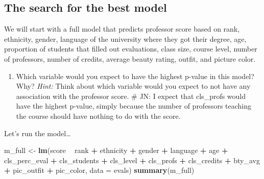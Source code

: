 \documentclass[]{article}
\newenvironment{Shaded}{\begin{snugshade}}{\end{snugshade}}
\newcommand{\KeywordTok}[1]{\textcolor[rgb]{0.13,0.29,0.53}{\textbf{#1}}}
\newcommand{\DataTypeTok}[1]{\textcolor[rgb]{0.13,0.29,0.53}{#1}}
\newcommand{\StringTok}[1]{\textcolor[rgb]{0.31,0.60,0.02}{#1}}
\newcommand{\OperatorTok}[1]{\textcolor[rgb]{0.81,0.36,0.00}{\textbf{#1}}}
\newcommand{\NormalTok}[1]{#1}
\providecommand{\tightlist}{%
  \setlength{\itemsep}{0pt}\setlength{\parskip}{0pt}}
\begin{document}
\subsection{The search for the best
model}\label{the-search-for-the-best-model}

We will start with a full model that predicts professor score based on
rank, ethnicity, gender, language of the university where they got their
degree, age, proportion of students that filled out evaluations, class
size, course level, number of professors, number of credits, average
beauty rating, outfit, and picture color.

\begin{enumerate}
\def\labelenumi{\arabic{enumi}.}
\setcounter{enumi}{10}
\tightlist
\item
  Which variable would you expect to have the highest p-value in this
  model? Why? \emph{Hint:} Think about which variable would you expect
  to not have any association with the professor score. \# JN: I expect
  that cls\_profs would have the highest p-value, simply because the
  number of professors teaching the course should have nothing to do
  with the score.
\end{enumerate}

Let's run the model\ldots{}

\begin{Shaded}
\begin{Highlighting}[]
\NormalTok{m_full <-}\StringTok{ }\KeywordTok{lm}\NormalTok{(score }\OperatorTok{~}\StringTok{ }\NormalTok{rank }\OperatorTok{+}\StringTok{ }\NormalTok{ethnicity }\OperatorTok{+}\StringTok{ }\NormalTok{gender }\OperatorTok{+}\StringTok{ }\NormalTok{language }\OperatorTok{+}\StringTok{ }\NormalTok{age }\OperatorTok{+}\StringTok{ }\NormalTok{cls_perc_eval }
             \OperatorTok{+}\StringTok{ }\NormalTok{cls_students }\OperatorTok{+}\StringTok{ }\NormalTok{cls_level }\OperatorTok{+}\StringTok{ }\NormalTok{cls_profs }\OperatorTok{+}\StringTok{ }\NormalTok{cls_credits }\OperatorTok{+}\StringTok{ }\NormalTok{bty_avg }
             \OperatorTok{+}\StringTok{ }\NormalTok{pic_outfit }\OperatorTok{+}\StringTok{ }\NormalTok{pic_color, }\DataTypeTok{data =}\NormalTok{ evals)}
\KeywordTok{summary}\NormalTok{(m_full)}
\end{Highlighting}
\end{Shaded}
\end{document}
